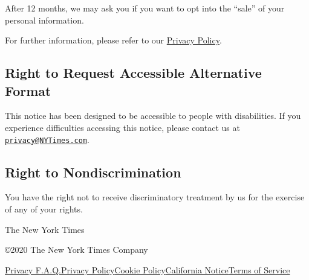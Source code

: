 After 12 months, we may ask you if you want to opt into the ``sale'' of
your personal information.

For further information, please refer to our
\href{http://www.nytimes3xbfgragh.onion/privacy/privacy-policy}{Privacy
Policy}.

\hypertarget{right-to-request-accessible-alternative-format}{%
\subsection{Right to Request Accessible Alternative
Format}\label{right-to-request-accessible-alternative-format}}

This notice has been designed to be accessible to people with
disabilities. If you experience difficulties accessing this notice,
please contact us at
\href{mailto:privacy@NYTimes.com}{\nolinkurl{privacy@NYTimes.com}}.

\hypertarget{right-to-nondiscrimination}{%
\subsection{Right to
Nondiscrimination}\label{right-to-nondiscrimination}}

You have the right not to receive discriminatory treatment by us for the
exercise of any of your rights.

The New York Times

©2020 The New York Times Company

\href{/privacy}{Privacy F.A.Q.}\href{/privacy/privacy-policy}{Privacy
Policy}\href{/privacy/cookie-policy}{Cookie
Policy}\href{/privacy/california-notice}{California
Notice}\href{https://help.nytimes3xbfgragh.onion/hc/en-us/articles/115014893428-Terms-of-service}{Terms
of Service}

